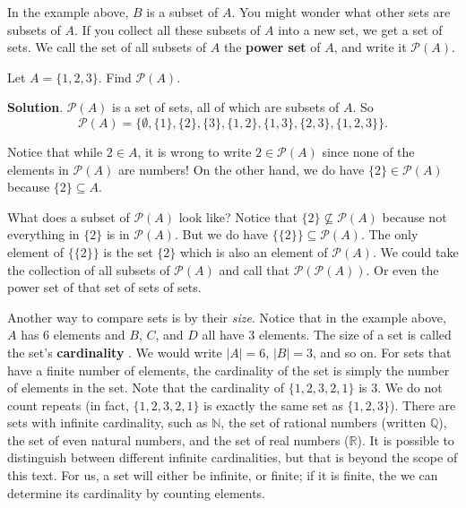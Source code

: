 \documentclass[11pt,]{book}
\newcommand{\terminology}[1]{\textbf{#1}}
\theoremstyle{ptxplainnotitle}
\theoremstyle{ptxplaintitle}
\theoremstyle{ptxdefinitionnotitle}
\theoremstyle{ptxdefinitiontitle}
\theoremstyle{ptxdefinitionnotitle}
\theoremstyle{ptxdefinitiontitle}
\theoremstyle{ptxdefinitionnotitle}
\theoremstyle{ptxdefinitiontitle}
\theoremstyle{ptxdefinitiontitlenonumber}
\theoremstyle{ptxdefinitiontitlenonumber}
\numberwithin{equation}{chapter}
\newcommand{\N}{\mathbb N}
\newcommand{\pow}{\mathcal P}
\begin{document}
\hypertarget{p-722}{}%
In the example above, \(B\) is a subset of \(A\). You might wonder what other sets are subsets of \(A\). If you collect all these subsets of \(A\) into a new set, we get a set of sets. We call the set of all subsets of \(A\) the \terminology{power set}  of \(A\), and write it \(\pow(A)\).%
\begin{example}\label{example-30}
\hypertarget{p-723}{}%
Let \(A = \{1,2,3\}\). Find \(\pow(A)\).%
\par\smallskip%
\noindent\textbf{Solution}.\hypertarget{solution-96}{}\quad%
\hypertarget{p-724}{}%
\(\pow(A)\) is a set of sets, all of which are subsets of \(A\). So%
\begin{equation*}
\pow(A) = \{ \emptyset, \{1\}, \{2\}, \{3\}, \{1,2\}, \{1, 3\}, \{2,3\}, \{1,2,3\}\}.
\end{equation*}
%
\par
\hypertarget{p-725}{}%
Notice that while \(2 \in A\), it is wrong to write \(2 \in \pow(A)\) since none of the elements in \(\pow(A)\) are numbers! On the other hand, we do have \(\{2\} \in \pow(A)\) because \(\{2\} \subseteq A\).%
\par
\hypertarget{p-726}{}%
What does a subset of \(\pow(A)\) look like? Notice that \(\{2\} \not\subseteq \pow(A)\) because not everything in \(\{2\}\) is in \(\pow(A)\). But we do have \(\{ \{2\} \} \subseteq \pow(A)\). The only element of \(\{\{2\}\}\) is the set \(\{2\}\) which is also an element of \(\pow(A)\). We could take the collection of all subsets of \(\pow(A)\) and call that \(\pow(\pow(A))\). Or even the power set of that set of sets of sets.%
\end{example}
\hypertarget{p-727}{}%
Another way to compare sets is by their \emph{size}. Notice that in the example above, \(A\) has 6 elements and \(B\), \(C\), and \(D\) all have 3 elements. The size of a set is called the set's \terminology{cardinality} . We would write \(|A| = 6\), \(|B| = 3\), and so on. For sets that have a finite number of elements, the cardinality of the set is simply the number of elements in the set. Note that the cardinality of \(\{ 1, 2, 3, 2, 1\}\) is 3. We do not count repeats (in fact, \(\{1, 2, 3, 2, 1\}\) is exactly the same set as \(\{1, 2, 3\}\)). There are sets with infinite cardinality, such as \(\N\), the set of rational numbers (written \(\mathbb Q\)), the set of even natural numbers, and the set of real numbers (\(\mathbb R\)). It is possible to distinguish between different infinite cardinalities, but that is beyond the scope of this text. For us, a set will either be infinite, or finite; if it is finite, the we can determine its cardinality by counting elements.%
\end{document}

